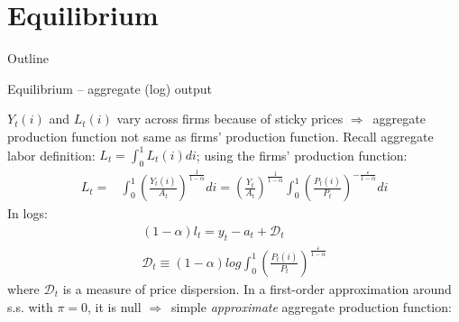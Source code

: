 \documentclass{beamer}
\newcommand{\tb}[1]{{\color{blue}{\textbf{#1}}}}
\newcommand{\tr}[1]{{\color{red}{\textbf{#1}}}}
\newenvironment{mytemize}
{\vfill\itemize[nolistsep,itemsep=\fill,label=\color{blue}{$\triangleright$}]}
  {\enditemize}
\newcommand{\rarr}{$\Rightarrow$\ }
\begin{document}
\section{Equilibrium}
\begin{frame}{Outline}
\tableofcontents[currentsection]
\end{frame}
%
%
\begin{frame}{Equilibrium -- aggregate (log) output}

  $Y_{t}(i)$ and $L_t(i)$ vary across firms because of sticky prices \rarr aggregate production function not same as firms' production function.
Recall aggregate labor definition: $L_t = \int_0^1 L_t(i) di$;
using the firms' production function:
\begin{align*}
L_t =& \int_0^1 \left( \frac{Y_t(i)}{A_t}\right)^{\frac{1}{1-\alpha}}di = \left( \frac{Y_t}{A_t}\right)^{\frac{1}{1-\alpha}} \int_0^1 \left( \frac{P_t(i)}{P_t}\right)^{-\frac{\varepsilon}{1-\alpha}} di
\end{align*}
In logs:
\begin{align*}
  (1-\alpha) l_t = y_t -a_t +\mathcal{D}_t \\
  \mathcal{D}_t \equiv (1-\alpha) log \int_0^1 \left( \frac{P_t(i)}{P_t} \right)^{\frac{\varepsilon}{1-\alpha}}
\end{align*}
where $\mathcal D_t$ is a measure of price dispersion. In a first-order approximation around s.s. with $\pi=0$, it is null \rarr simple \textit{approximate} aggregate production function:
\tr{$y_t = a_t + (1-\alpha) l_t$}

\end{frame}
\end{document}

